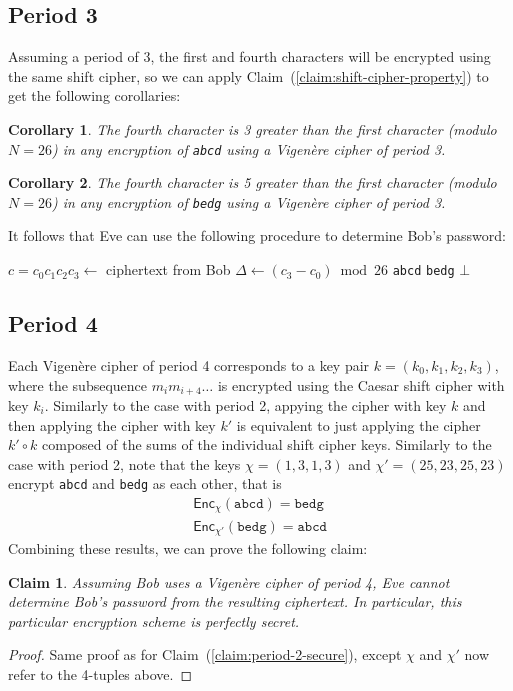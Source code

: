 \documentclass[12pt]{article}
\numberwithin{equation}{section}
\theoremstyle{plain}
\newtheorem{claim}{Claim}
\newtheorem{corollary}{Corollary}
\newcommand{\algo}[1]{\mathsf{#1}}
\newcommand{\enc}{\algo{Enc}}
\begin{document}
\subsection*{Period 3}

Assuming a period of 3,
the first and fourth characters will be encrypted using the same shift cipher,
so we can apply Claim~(\ref{claim:shift-cipher-property}) to get the following corollaries:
\begin{corollary}
The fourth character is 3 greater than the first character (modulo $N = 26$) in any encryption
of \texttt{abcd} using a Vigen\`ere cipher of period 3.
\end{corollary}
\begin{corollary}
The fourth character is 5 greater than the first character (modulo $N = 26$) in any encryption
of \texttt{bedg} using a Vigen\`ere cipher of period 3.
\end{corollary}
It follows that Eve can use the following procedure to determine Bob's password:
\begin{algorithm}[H]
\begin{algorithmic}
    \State $c = c_0c_1c_2c_3 \gets$ ciphertext from Bob
    \State $\Delta \gets (c_3 - c_0) \bmod 26$
        \State \Return \texttt{abcd}
        \State \Return \texttt{bedg}
    \Else
        \State \Return $\bot$
    \EndIf
\EndProcedure
\end{algorithmic}
\end{algorithm}

\subsection*{Period 4}

Each Vigen\`ere cipher of period 4 corresponds to a key pair $k = (k_0, k_1, k_2, k_3)$,
where the subsequence $m_im_{i+4}\ldots$
is encrypted using the Caesar shift cipher with key $k_i$.
Similarly to the case with period 2, appying the cipher with key $k$
and then applying the cipher with key $k'$
is equivalent to just applying the cipher $k' \circ k$
composed of the sums of the individual shift cipher keys.
Similarly to the case with period 2, note that the keys
$\chi = (1, 3, 1, 3)$ and $\chi' = (25, 23, 25, 23)$
encrypt \texttt{abcd} and \texttt{bedg} as each other, that is
\begin{gather*}
    \enc_{\chi}(\texttt{abcd}) = \texttt{bedg}\\
    \enc_{\chi'}(\texttt{bedg}) = \texttt{abcd}
\end{gather*}
Combining these results, we can prove the following claim:
\begin{claim}\label{claim:period-4-secure}
Assuming Bob uses a Vigen\`ere cipher of period 4,
Eve cannot determine Bob's password from the resulting ciphertext.
In particular, this particular encryption scheme is perfectly secret.
\end{claim}
\begin{proof}
Same proof as for Claim~(\ref{claim:period-2-secure}),
except $\chi$ and $\chi'$ now refer to the 4-tuples above.
\end{proof}
\end{document}
